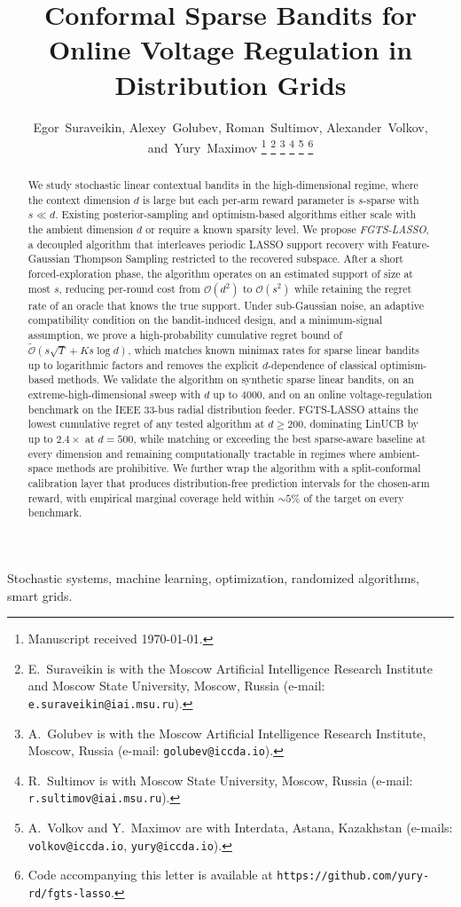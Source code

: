 \documentclass[journal,twoside,web]{ieeecolor}
\title{Conformal Sparse Bandits for Online Voltage Regulation in Distribution Grids}
\author{Egor~Suraveikin,
        Alexey~Golubev,
        Roman~Sultimov,
        Alexander~Volkov,
        and~Yury~Maximov%
\thanks{Manuscript received \today.}%
\thanks{E.~Suraveikin is with the Moscow Artificial Intelligence Research Institute and Moscow State University, Moscow, Russia (e-mail: \texttt{e.suraveikin@iai.msu.ru}).}%
\thanks{A.~Golubev is with the Moscow Artificial Intelligence Research Institute, Moscow, Russia (e-mail: \texttt{golubev@iccda.io}).}%
\thanks{R.~Sultimov is with Moscow State University, Moscow, Russia (e-mail: \texttt{r.sultimov@iai.msu.ru}).}%
\thanks{A.~Volkov and Y.~Maximov are with Interdata, Astana, Kazakhstan (e-mails: \texttt{volkov@iccda.io}, \texttt{yury@iccda.io}).}%
\thanks{Code accompanying this letter is available at \texttt{https://github.com/yury-rd/fgts-lasso}.}%
}
\begin{document}
\maketitle

\begin{abstract}
We study stochastic linear contextual bandits in the high-dimensional regime, where the context dimension $d$ is large but each per-arm reward parameter is $s$-sparse with $s \ll d$. Existing posterior-sampling and optimism-based algorithms either scale with the ambient dimension $d$ or require a known sparsity level. We propose \emph{FGTS-LASSO}, a decoupled algorithm that interleaves periodic LASSO support recovery with Feature-Gaussian Thompson Sampling restricted to the recovered subspace. After a short forced-exploration phase, the algorithm operates on an estimated support of size at most $s$, reducing per-round cost from $\mathcal{O}(d^2)$ to $\mathcal{O}(s^2)$ while retaining the regret rate of an oracle that knows the true support. Under sub-Gaussian noise, an adaptive compatibility condition on the bandit-induced design, and a minimum-signal assumption, we prove a high-probability cumulative regret bound of $\tilde{\mathcal{O}}(s\sqrt{T} + Ks\log d)$, which matches known minimax rates for sparse linear bandits up to logarithmic factors and removes the explicit $d$-dependence of classical optimism-based methods. We validate the algorithm on synthetic sparse linear bandits, on an extreme-high-dimensional sweep with $d$ up to $4000$, and on an online voltage-regulation benchmark on the IEEE 33-bus radial distribution feeder. FGTS-LASSO attains the lowest cumulative regret of any tested algorithm at $d \geq 200$, dominating LinUCB by up to $2.4\times$ at $d = 500$, while matching or exceeding the best sparse-aware baseline at every dimension and remaining computationally tractable in regimes where ambient-space methods are prohibitive. We further wrap the algorithm with a split-conformal calibration layer that produces distribution-free prediction intervals for the chosen-arm reward, with empirical marginal coverage held within $\sim$$5\%$ of the target on every benchmark.
\end{abstract}

\begin{IEEEkeywords}
Stochastic systems, machine learning, optimization, randomized algorithms, smart grids.
\end{IEEEkeywords}
\end{document}
